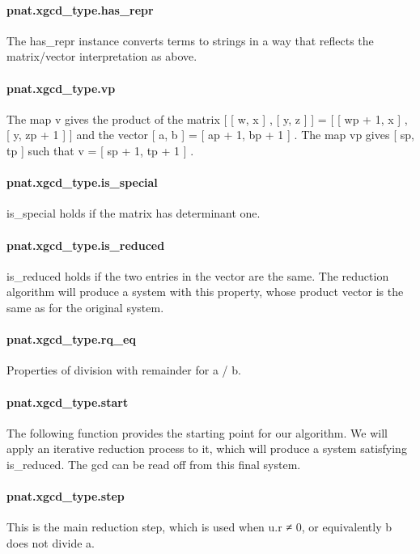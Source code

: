 \documentclass{article}
\begin{document}
\paragraph{pnat.xgcd\_type.has\_repr}
\par
The has\_repr instance converts terms to strings in a way that
reflects the matrix/vector interpretation as above.
\paragraph{pnat.xgcd\_type.vp}
\par
The map v gives the product of the matrix
{[}
{[}
w, x
{]}
, 
{[}
y, z
{]}
{]}
 = 
{[}
{[}
wp + 1, x
{]}
, 
{[}
y, zp + 1
{]}
{]}
and the vector 
{[}
a, b
{]}
 = 
{[}
ap + 1, bp + 1
{]}
.  The map
vp gives 
{[}
sp, tp
{]}
 such that v = 
{[}
sp + 1, tp + 1
{]}
.
\paragraph{pnat.xgcd\_type.is\_special}
\par
is\_special holds if the matrix has determinant one.
\paragraph{pnat.xgcd\_type.is\_reduced}
\par
is\_reduced holds if the two entries in the vector are the
same.  The reduction algorithm will produce a system with this
property, whose product vector is the same as for the original
system.
\paragraph{pnat.xgcd\_type.rq\_eq}
\par
Properties of division with remainder for a / b.
\paragraph{pnat.xgcd\_type.start}
\par
The following function provides the starting point for
our algorithm.  We will apply an iterative reduction process
to it, which will produce a system satisfying is\_reduced.
The gcd can be read off from this final system.
\paragraph{pnat.xgcd\_type.step}
\par
This is the main reduction step, which is used when u.r ≠ 0, or
equivalently b does not divide a.
\end{document}
